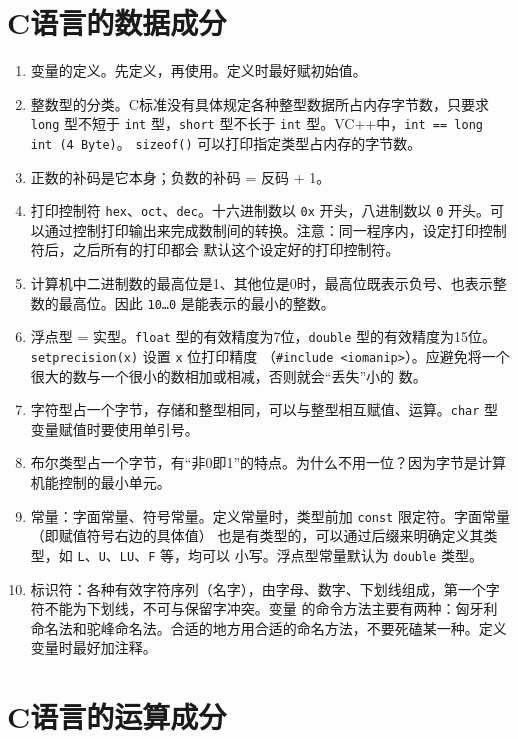 \documentclass[UTF8]{ctexart}
\begin{document}
\section{C语言的数据成分}
\begin{enumerate}
    \item 变量的定义。先定义，再使用。定义时最好赋初始值。
    \item 整数型的分类。C标准没有具体规定各种整型数据所占内存字节数，只要求 \texttt{long} 型不短于 \texttt{int}
    型，\texttt{short} 型不长于 \texttt{int} 型。VC++中，\texttt{int == long int (4 Byte)}。
    \texttt{sizeof()} 可以打印指定类型占内存的字节数。
    \item 正数的补码是它本身；负数的补码 = 反码 + 1。
    \item 打印控制符 \texttt{hex}、\texttt{oct}、\texttt{dec}。十六进制数以 \texttt{0x} 开头，八进制数以
    \texttt{0} 开头。可以通过控制打印输出来完成数制间的转换。注意：同一程序内，设定打印控制符后，之后所有的打印都会
    默认这个设定好的打印控制符。
    \item 计算机中二进制数的最高位是1、其他位是0时，最高位既表示负号、也表示整数的最高位。因此 \texttt{10\ldots0}
    是能表示的最小的整数。
    \item 浮点型 = 实型。\texttt{float} 型的有效精度为7位，\texttt{double} 型的有效精度为15位。
    \texttt{setprecision(x)} 设置 \texttt{x} 位打印精度
    （\texttt{#include <iomanip>}）。应避免将一个很大的数与一个很小的数相加或相减，否则就会“丢失”小的
    数。
    \item 字符型占一个字节，存储和整型相同，可以与整型相互赋值、运算。\texttt{char} 型变量赋值时要使用单引号。
    \item 布尔类型占一个字节，有“非0即1”的特点。为什么不用一位？因为字节是计算机能控制的最小单元。
    \item 常量：字面常量、符号常量。定义常量时，类型前加 \texttt{const} 限定符。字面常量（即赋值符号右边的具体值）
    也是有类型的，可以通过后缀来明确定义其类型，如 \texttt{L}、\texttt{U}、\texttt{LU}、\texttt{F} 等，均可以
    小写。浮点型常量默认为 \texttt{double} 类型。
    \item 标识符：各种有效字符序列（名字），由字母、数字、下划线组成，第一个字符不能为下划线，不可与保留字冲突。变量
    的命令方法主要有两种：匈牙利命名法和驼峰命名法。合适的地方用合适的命名方法，不要死磕某一种。定义变量时最好加注释。
\end{enumerate}

\section{C语言的运算成分}
\end{document}

